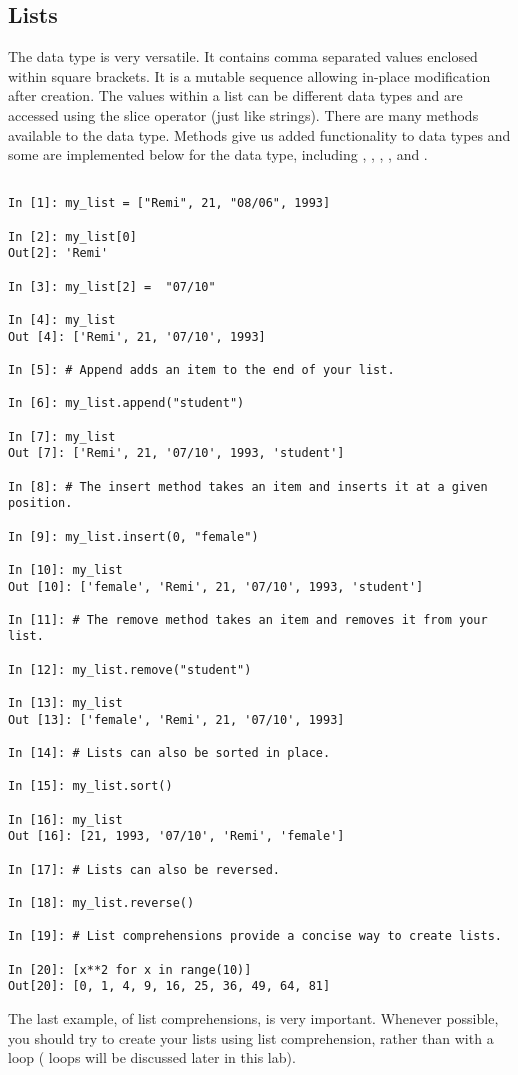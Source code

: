 \subsection*{Lists}
\begin{example}

The  data type is very versatile. 
It contains comma separated values enclosed within square brackets. 
It is a mutable sequence allowing in-place modification after creation. 
The values within a list can be different data types and are accessed using the 
slice operator (just like strings). There are many methods available to the  data type. Methods give us added functionality to data types and some are implemented below for the  data type, including , , , , and .

\begin{lstlisting}

In [1]: my_list = ["Remi", 21, "08/06", 1993]

In [2]: my_list[0]
Out[2]: 'Remi'

In [3]: my_list[2] =  "07/10"

In [4]: my_list
Out [4]: ['Remi', 21, '07/10', 1993]

In [5]: # Append adds an item to the end of your list.

In [6]: my_list.append("student")

In [7]: my_list
Out [7]: ['Remi', 21, '07/10', 1993, 'student']

In [8]: # The insert method takes an item and inserts it at a given position. 

In [9]: my_list.insert(0, "female")

In [10]: my_list
Out [10]: ['female', 'Remi', 21, '07/10', 1993, 'student']

In [11]: # The remove method takes an item and removes it from your list.

In [12]: my_list.remove("student")

In [13]: my_list
Out [13]: ['female', 'Remi', 21, '07/10', 1993]

In [14]: # Lists can also be sorted in place. 

In [15]: my_list.sort()

In [16]: my_list
Out [16]: [21, 1993, '07/10', 'Remi', 'female']

In [17]: # Lists can also be reversed.

In [18]: my_list.reverse()

In [19]: # List comprehensions provide a concise way to create lists. 

In [20]: [x**2 for x in range(10)]
Out[20]: [0, 1, 4, 9, 16, 25, 36, 49, 64, 81]

\end{lstlisting}

The last example, of list comprehensions, is very important. Whenever possible, you should try to create your lists using list comprehension, rather than with a  loop ( loops will be discussed later in this lab).
\end{example}

